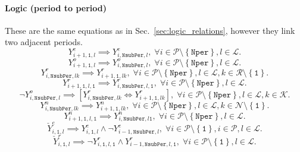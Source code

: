 \documentclass{amsart}
\begin{document}
\paragraph{Logic (period to period)}
%
These are the same equations as in Sec.~\ref{sec:logic_relations}, however they
link two adjacent periods.
\begin{equation}
    Y^e_{i+1,\mathtt{1},l} \implies Y^e_{i, \mathtt{NsubPer}, l}, \; \forall 
    i \in \mathcal{P} \setminus \left\{\mathtt{Nper}\right\},
    l\in \mathcal{L}.
\end{equation}
%
%
\begin{equation}
    Y^o_{i+1,\mathtt{1},l} \implies Y^o_{i,\mathtt{NsubPer},l}, \; \forall 
    i \in \mathcal{P} \setminus \left\{\mathtt{Nper}\right\},
    l\in \mathcal{L}.
\end{equation}
%
%
\begin{equation}
    Y^r_{i,\mathtt{NsubPer},lk} \implies Y^r_{i+1, \mathtt{1}, lk}, \; \forall 
    i \in \mathcal{P} \setminus \left\{\mathtt{Nper}\right\},
    l\in \mathcal{L},
    k\in \mathcal{R} \setminus \left\{\mathtt{1}\right\}.
\end{equation}
%
%
\begin{equation}
    Y^r_{i+1, \mathtt{1}, l,\mathtt{1}} \implies 
    Y^r_{i,\mathtt{NsubPer},l,\mathtt{1}} , \; \forall 
    i \in \mathcal{P} \setminus \left\{\mathtt{Nper}\right\},
    l\in \mathcal{L}.
\end{equation}
%
%
\begin{equation}
    \neg Y^o_{i,\mathtt{NsubPer},l} \implies 
    \left[Y^r_{i,\mathtt{NsubPer},lk} \iff 
    Y^r_{i+1,\mathtt{1},lk}\right]
    , \; \forall
    i \in \mathcal{P} \setminus \left\{\mathtt{Nper}\right\},
    l \in \mathcal{L},
    k \in \mathcal{K}.
\end{equation}
%
%
\begin{equation}
    Y^n_{i,\mathtt{NsubPer},lk} \implies 
    Y^n_{i+1,\mathtt{1}, lk}, \; \forall 
    i \in \mathcal{P} \setminus \left\{\mathtt{Nper}\right\},
    l\in \mathcal{L},
    k\in \mathcal{N} \setminus \left\{\mathtt{1}\right\}.
\end{equation}
%
%
\begin{equation}
    Y^n_{i+1,\mathtt{1}, l,\mathtt{1}} \implies 
    Y^n_{i,\mathtt{NsubPer},l\mathtt{1}} , \; \forall 
    i \in \mathcal{P} \setminus \left\{\mathtt{Nper}\right\},
    l\in \mathcal{L}.
\end{equation}
%
%
%
\begin{equation}
    \check{Y}^e_{i,\mathtt{1},l} \implies 
    Y^e_{i,\mathtt{1},l} \wedge \neg Y^e_{i-1,\mathtt{NsubPer},l}, \;
    \forall 
    i \in \mathcal{P} \setminus \left\{\mathtt{1}\right\},
    i \in \mathcal{P} ,
    l \in \mathcal{L}.
\end{equation}
%
\begin{equation}
    \check{Y}^r_{i,\mathtt{1},l} \implies 
    \neg Y^r_{i,\mathtt{1},l,\mathtt{1}} \wedge 
    Y^r_{i-1,\mathtt{NsubPer},l,\mathtt{1}}, \;
    \forall 
    i \in \mathcal{P} \setminus \left\{\mathtt{1}\right\},
    l \in \mathcal{L}.
\end{equation}
\end{document}

